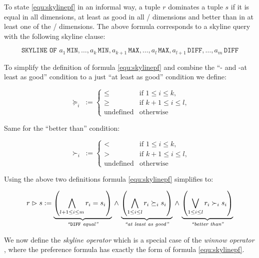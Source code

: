 To state \eqref{equ:skylinepf} in an informal way, a tuple $r$
dominates a tuple $s$ if it is equal in all 
dimensions, at least as good in all /
dimensions and better than in at least one of the
/ dimensions.
%
The above formula corresponds to a skyline query with the following
skyline clause:

\[
\texttt{SKYLINE OF\ } a_1\,\texttt{MIN}, \ldots, a_k\,\texttt{MIN}, a_{k+1}\,\texttt{MAX}, \ldots, a_l\,\texttt{MAX}, a_{l+1}\,\texttt{DIFF}, \ldots, a_m\,\texttt{DIFF}
\]

\bigskip
To simplify the definition of formula \eqref{equ:skylinepf} and
combine the ``- and -at least as good''
condition to a just ``at least as good'' condition we define:

\begin{equation}
\succeq_i\; := 
\begin{cases}
\le & \text{if $1 \le i \le k$,} \\
\ge & \text{if $k+1 \le i \le l$,} \\
\text{undefined} & \text{otherwise}
\end{cases}
\end{equation}

\noindent
Same for the ``better than'' condition:

\begin{equation}
\succ_i\; := 
\begin{cases}
< & \text{if $1 \le i \le k$,} \\
> & \text{if $k+1 \le i \le l$,} \\
\text{undefined} & \text{otherwise}
\end{cases}
\end{equation}

\noindent
Using the above two definitions formula \eqref{equ:skylinepf}
simplifies to:

\begin{equation}
r \vartriangleright s := 
\underbrace{\left( \bigwedge_{l+1 \le i \le m} r_i = s_i \right)}_{\textit{``\/}\texttt{DIFF}\textit{ equal''}} \,\land\,
\underbrace{\left( \bigwedge_{1 \le i \le l} r_i \succeq_i s_i \right)}_{\textit{``at least as good''}} \,\land\,
\underbrace{\left( \bigvee_{1 \le i \le l} r_i \succ_i s_i \right)}_{\textit{``better than''}}
\end{equation}


We now define the \emph{skyline operator} which is a special
case of the \emph{winnow operator} \citep{Chomicki2003a}, where the
preference formula has exactly the form of formula
\eqref{equ:skylinepf}.

